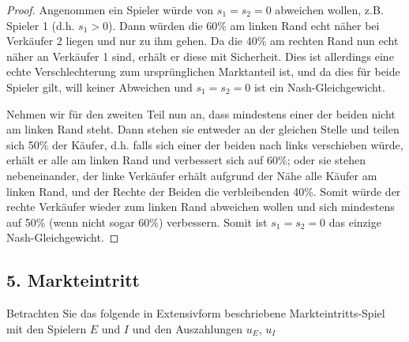 \documentclass[12pt]{article}
\begin{document}
\begin{enumerate}[label=\alph*\upshape)]
\begin{proof}
			 Angenommen ein Spieler würde von $s_1 = s_2 = 0$ abweichen wollen, z.B. Spieler 1 (d.h. $s_1 > 0$). Dann würden die 60\% am linken Rand echt näher bei Verkäufer 2 liegen und nur zu ihm gehen. Da die 40\% am rechten Rand nun echt näher an Verkäufer 1 sind, erhält er diese mit Sicherheit. Dies ist allerdings eine echte Verschlechterung zum ursprünglichen Marktanteil ist, und da dies für beide Spieler gilt, will keiner Abweichen und $s_1 = s_2 = 0$ ist ein Nash-Gleichgewicht. 
			 
			 Nehmen wir für den zweiten Teil nun an, dass mindestens einer der beiden nicht am linken Rand steht. Dann stehen sie entweder an der gleichen Stelle und teilen sich 50\% der Käufer, d.h. falls sich einer der beiden nach links verschieben würde, erhält er alle am linken Rand und verbessert sich auf 60\%; oder sie stehen nebeneinander, der linke Verkäufer erhält aufgrund der Nähe alle Käufer am linken Rand, und der Rechte der Beiden die verbleibenden 40\%. Somit würde der rechte Verkäufer wieder zum linken Rand abweichen wollen und sich mindestens auf 50\% (wenn nicht sogar 60\%) verbessern. Somit ist $s_1 = s_2 = 0$ das einzige Nash-Gleichgewicht.
		\end{proof}
\end{enumerate}

\newpage

\subsection*{5. Markteintritt}

Betrachten Sie das folgende in Extensivform beschriebene Markteintritts-Spiel mit den Spielern $E$ und $I$ und den Auszahlungen $u_E$, $u_I$
\end{document}
